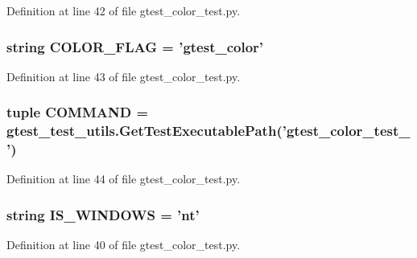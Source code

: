 \-Definition at line 42 of file gtest\-\_\-color\-\_\-test.\-py.

\hypertarget{namespacegtest__color__test_ac6096dcc753c3d955535dbbb74c8c538}{
\subsubsection[{\-C\-O\-L\-O\-R\-\_\-\-F\-L\-A\-G}]{\setlength{\rightskip}{0pt plus 5cm}string {\bf \-C\-O\-L\-O\-R\-\_\-\-F\-L\-A\-G} = 'gtest\-\_\-color'}}\label{dd/dee/namespacegtest__color__test_ac6096dcc753c3d955535dbbb74c8c538}


\-Definition at line 43 of file gtest\-\_\-color\-\_\-test.\-py.

\hypertarget{namespacegtest__color__test_add010199942a26d17bd560c1ce462eeb}{
\subsubsection[{\-C\-O\-M\-M\-A\-N\-D}]{\setlength{\rightskip}{0pt plus 5cm}tuple {\bf \-C\-O\-M\-M\-A\-N\-D} = {\bf gtest\-\_\-test\-\_\-utils.\-Get\-Test\-Executable\-Path}('gtest\-\_\-color\-\_\-test\-\_\-')}}\label{dd/dee/namespacegtest__color__test_add010199942a26d17bd560c1ce462eeb}


\-Definition at line 44 of file gtest\-\_\-color\-\_\-test.\-py.

\hypertarget{namespacegtest__color__test_ab1b21b880253abfa3ab3dfc19b06814c}{
\subsubsection[{\-I\-S\-\_\-\-W\-I\-N\-D\-O\-W\-S}]{\setlength{\rightskip}{0pt plus 5cm}string {\bf \-I\-S\-\_\-\-W\-I\-N\-D\-O\-W\-S} = 'nt'}}\label{dd/dee/namespacegtest__color__test_ab1b21b880253abfa3ab3dfc19b06814c}


\-Definition at line 40 of file gtest\-\_\-color\-\_\-test.\-py.

